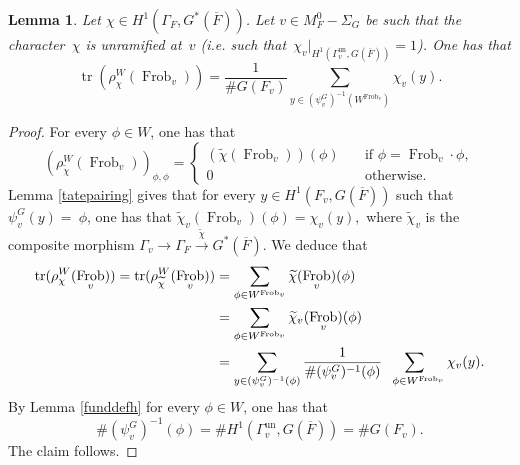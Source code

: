 \documentclass[a4paper,english,12pt]{amsart}
\newcommand{\CC}{\mathbb{C}}
\newcommand{\oF}{\overline F}
\newcommand{\ZZ}{\mathbb{Z}}
\newcommand{\wchi}{\widetilde{\chi}}
\DeclareMathOperator{\GL}{GL}
\DeclareMathOperator{\tr}{tr}
\DeclareMathOperator{\Frob}{Frob}
\DeclareMathOperator{\un}{un}
\newtheorem{lem}[equation]{Lemma}
\numberwithin{equation}{subsection}
\begin{document}
%
\begin{lem}\label{traceofl} Let $\chi\in H^1(\Gamma_F, G^*(\oF))$.  Let $v\in M_F^0-\Sigma_G$ be such that the character~$\chi$ is unramified at~$v$ (i.e. such that~$\chi_v|_{H^1(\Gamma_v^{\un}, G(\oF))}=1$). One has that %
$$\tr(\rho^W_{\chi}(\Frob_v))=\frac{1}{\# G(F_v)}\sum_{y\in (\psi_v^G)^{-1}(W^{\Frob_v})}\chi_v(y).$$%
\end{lem}
\begin{proof}
For every $\phi\in W$, one has that $$(\rho^W_{\widetilde\chi}(\Frob_v))_{\phi, \phi}=\begin{cases} (\widetilde\chi(\Frob_v))(\phi)&\quad \text{if } \phi=\Frob_v\cdot\phi,\\
0&\quad\text{otherwise.}
\end{cases}$$
Lemma \ref{tatepairing} gives that for every $y\in H^1(F_v, G(\oF))$ such that $\psi^G_v(y)=~\phi$, one has that $\widetilde\chi_v(\Frob_v)(\phi)=\chi_v(y),$ where $\widetilde\chi_v$ is the composite morphism $\Gamma_v\to \Gamma_F\xrightarrow{\widetilde{\chi}}G^*(\oF)$.  We deduce that  \begin{align*}\tr(\rho^W_{\chi}(\Frob_v))=\tr(\rho^W_{\widetilde\chi}(\Frob_v))&=\sum _{\phi\in W^{\Frob_v}}\widetilde\chi(\Frob_v)(\phi)\\
&=\sum _{\phi\in W^{\Frob_v}}\widetilde\chi_v(\Frob_v)(\phi)\\
&=\sum_{y\in(\psi^G_v)^{-1}(\phi)}\frac{1}{\#(\psi_v^G)^{-1}(\phi)}\sum_{\hspace{0.2cm}\phi\in W^{\Frob_v}}\chi_v(y).
\end{align*}
By Lemma \ref{funddefh} for every $\phi\in W$, one has that \begin{equation*}\#(\psi_v^G)^{-1}(\phi)=\#H^1(\Gamma^{\un}_v, G(\oF))=\# G(F_v).\end{equation*}
The claim follows.
\end{proof}
\end{document}

